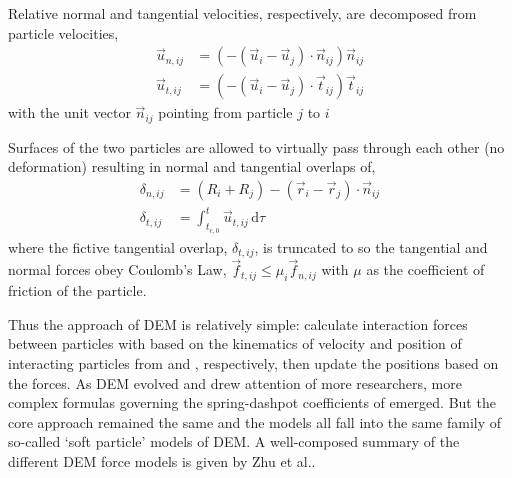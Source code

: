 \documentclass[11pt]{report} %
\begin{document}
Relative normal and tangential velocities, respectively, are decomposed from particle velocities,
\begin{subequations}
\label{eq:dem-velocities}
\begin{align}
	\vec{u}_{n,ij} &= (-(\vec{u}_i-\vec{u}_j)\cdot\vec{n}_{ij})\vec{n}_{ij} \\
	\vec{u}_{t,ij} &= (-(\vec{u}_i-\vec{u}_j)\cdot\vec{t}_{ij})\vec{t}_{ij}
\end{align}
\end{subequations}
with the unit vector $\vec{n}_{ij}$ pointing from particle $j$ to $i$

Surfaces of the two particles are allowed to virtually pass through each other (no deformation) resulting in normal and tangential overlaps of,
\begin{subequations}
\label{eq:dem-overlaps}
\begin{align}
	\delta_{n,ij} &= (R_i + R_j) - (\vec{r}_i -\vec{r}_j)\cdot \vec{n}_{ij} \\
	\delta_{t,ij} &= \int_{t_{c,0}}^{t} \vec{u}_{t,ij}\,\mathrm{d}\tau 
\end{align}
\end{subequations}
where the fictive tangential overlap, $\delta_{t,ij}$, is truncated to so the tangential and normal forces obey Coulomb's Law, $\vec{f}_{t,ij} \le \mu_i \vec{f}_{n,ij}$ with $\mu$ as the coefficient of friction of the particle.

Thus the approach of DEM is relatively simple: calculate interaction forces between particles with  based on the kinematics of velocity and position of interacting particles from  and , respectively, then update the positions based on the forces. As DEM evolved and drew attention of more researchers, more complex formulas governing the spring-dashpot coefficients of  emerged. But the core approach remained the same and the models all fall into the same family of so-called `soft particle' models of DEM. A well-composed summary of the different DEM force models is given by Zhu et al..\cite{Zhu2007}
\end{document}
